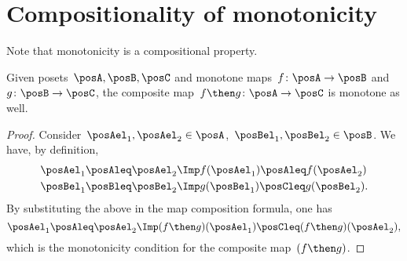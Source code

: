 

\section{Compositionality of monotonicity}
Note that monotonicity is a compositional property.
\begin{lemma}
  Given posets~$\posA,\posB,\posC$ and monotone maps~$f\colon \posA \to \posB$ and~$g\colon \posB \to \posC$, the composite map~$f\then g\colon  \posA \to \posC$ is
  monotone as well.
\end{lemma}
\begin{proof}
  Consider~$\posAel_1,\posAel_2 \in \posA$,~$\posBel_1,\posBel_2\in \posB$. We have, by definition,
  \begin{equation}
    \begin{aligned}
      \posAel_1\posAleq \posAel_2 &\Imp f(\posAel_1)\posAleq f(\posAel_2)\\
      \posBel_1\posBleq \posBel_2 &\Imp g(\posBel_1)\posCleq g(\posBel_2).
    \end{aligned}
  \end{equation}
  By substituting the above in the map composition formula, one has
  \begin{equation}
    \posAel_1\posAleq \posAel_2 \Imp (f\then g)(\posAel_1) \posCleq (f\then g)(\posAel_2),
  \end{equation}
  which is the monotonicity condition for the composite map~$(f\then g)$.
\end{proof}

